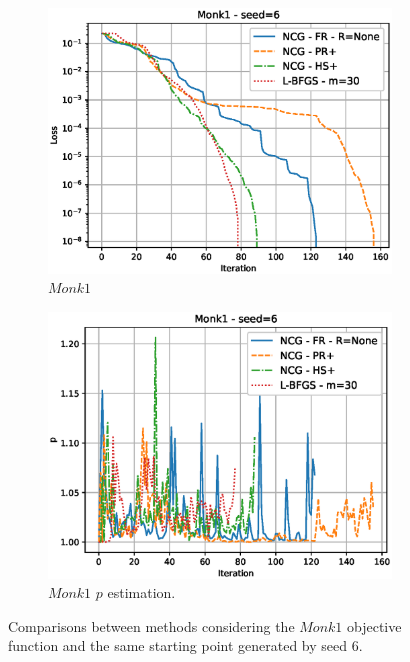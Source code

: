\documentclass[11pt]{article}
\begin{document}
\begin{figure}[H]
\centering
\begin{subfigure}{.5\textwidth}
  \centering
  \includegraphics[width=1.1\linewidth]{Images/m1-6_comp.eps}
  \caption{$Monk 1$}
  \label{fig:sub1}
\end{subfigure}%
\begin{subfigure}{.5\textwidth}
  \centering
  \includegraphics[width=1.1\linewidth]{Images/m1-6_comp_p.eps}
  \caption{$Monk1$ $p$ estimation.}
  \label{fig:sub2}
\end{subfigure}
\caption{Comparisons between methods considering the $Monk1$  objective function and the same starting point generated by seed 6.}
\label{fig:test1}
\end{figure}
\end{document}

